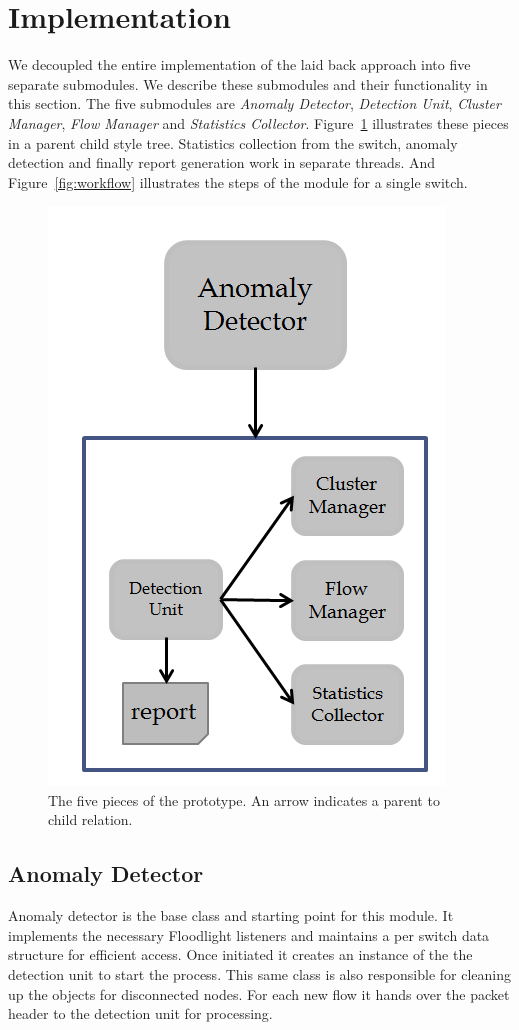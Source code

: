 \documentclass[twocolumn]{article}
\begin{document}
\section{Implementation}
We decoupled the entire implementation of the laid back approach into five separate submodules. We describe these submodules and their functionality in this section. The five submodules are \emph{Anomaly Detector}, \emph{Detection Unit}, \emph{Cluster Manager}, \emph{Flow Manager} and \emph{Statistics Collector}. Figure~\ref{fig:design} illustrates these pieces in a parent child style tree. Statistics collection from the switch, anomaly detection and finally report generation work in separate threads. And Figure~\ref{fig:workflow} illustrates the steps of the module for a single switch.

\begin{figure}[!ht]
\centering
	\includegraphics[scale=0.5]{images/designpieces.png}
\caption{The five pieces of the prototype. An arrow indicates a parent to child relation.}
\label{fig:design}
\end{figure}

\subsection{Anomaly Detector}
Anomaly detector is the base class and starting point for this module. It implements the necessary Floodlight listeners and maintains a per switch data structure for efficient access. Once initiated it creates an instance of the the detection unit to start the process. This same class is also responsible for cleaning up the objects for disconnected nodes. For each new flow it hands over the packet header to the detection unit for processing.
\end{document}
